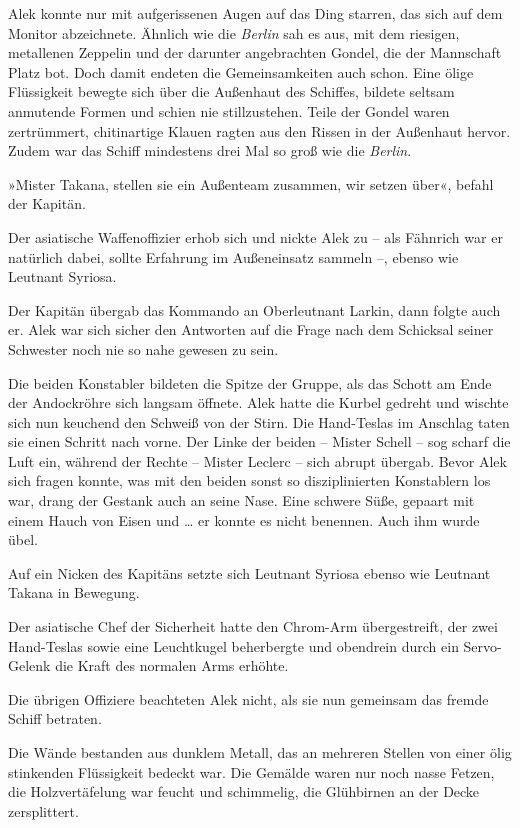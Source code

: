 Alek konnte nur mit aufgerissenen Augen auf das Ding starren, das
sich auf dem Monitor abzeichnete. Ähnlich wie die \textit{Berlin} sah es
aus, mit dem riesigen, metallenen Zeppelin und der darunter
angebrachten Gondel, die der Mannschaft Platz bot. Doch damit
endeten die Gemeinsamkeiten auch schon. Eine ölige Flüssigkeit
bewegte sich über die Außenhaut des Schiffes, bildete seltsam
anmutende Formen und schien nie stillzustehen. Teile der Gondel
waren zertrümmert, chitinartige Klauen ragten aus den Rissen in der
Außenhaut hervor. Zudem war das Schiff mindestens drei Mal so groß
wie die \textit{Berlin}.

»Mister Takana, stellen sie ein Außenteam zusammen, wir setzen
über«, befahl der Kapitän.

Der asiatische Waffenoffizier erhob sich und nickte Alek zu – als
Fähnrich war er natürlich dabei, sollte Erfahrung im Außeneinsatz
sammeln –, ebenso wie Leutnant Syriosa.

Der Kapitän übergab das Kommando an Oberleutnant Larkin, dann
folgte auch er. Alek war sich sicher den Antworten auf die Frage
nach dem Schicksal seiner Schwester noch nie so nahe gewesen zu
sein.

\tb

Die beiden Konstabler bildeten die Spitze der Gruppe, als das
Schott am Ende der Andockröhre sich langsam öffnete. Alek hatte die
Kurbel gedreht und wischte sich nun keuchend den Schweiß von der
Stirn. Die Hand-Teslas im Anschlag taten sie einen Schritt nach
vorne. Der Linke der beiden – Mister Schell – sog scharf die Luft
ein, während der Rechte – Mister Leclerc – sich abrupt übergab.
Bevor Alek sich fragen konnte, was mit den beiden sonst so
disziplinierten Konstablern los war, drang der Gestank auch an
seine Nase. Eine schwere Süße, gepaart mit einem Hauch von Eisen
und \ldots{} er konnte es nicht benennen. Auch ihm wurde übel.

Auf ein Nicken des Kapitäns setzte sich Leutnant Syriosa ebenso wie
Leutnant Takana in Bewegung.

Der asiatische Chef der Sicherheit hatte den Chrom-Arm
übergestreift, der zwei Hand-Teslas sowie eine Leuchtkugel
beherbergte und obendrein durch ein Servo-Gelenk die Kraft des
normalen Arms erhöhte.

Die übrigen Offiziere beachteten Alek nicht, als sie nun gemeinsam
das fremde Schiff betraten.

Die Wände bestanden aus dunklem Metall, das an mehreren Stellen von
einer ölig stinkenden Flüssigkeit bedeckt war. Die Gemälde waren
nur noch nasse Fetzen, die Holzvertäfelung war feucht und
schimmelig, die Glühbirnen an der Decke zersplittert.

